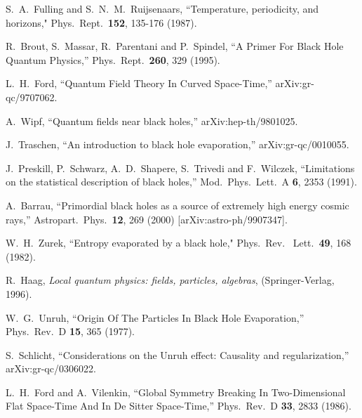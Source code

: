 \documentclass[12pt]{article}
\begin{document}
\begin{thebibliography}{99}
 S.~A.~Fulling and S.~N.~M.~Ruijsenaars,  ``Temperature, periodicity, and horizons,"  Phys.\ Rept.\  {\bf 152}, 135-176 (1987).

R.~Brout, S.~Massar, R.~Parentani and P.~Spindel,
``A Primer For Black Hole Quantum Physics,''
Phys.\ Rept.\  {\bf 260}, 329 (1995).

L.~H.~Ford,
``Quantum Field Theory In Curved Space-Time,''
arXiv:gr-qc/9707062.

A.~Wipf,
``Quantum fields near black holes,''
arXiv:hep-th/9801025.

J.~Traschen,
``An introduction to black hole evaporation,''
arXiv:gr-qc/0010055.

J.~Preskill, P.~Schwarz, A.~D.~Shapere, S.~Trivedi and F.~Wilczek,
``Limitations on the statistical description of black holes,''
Mod.\ Phys.\ Lett.\ A {\bf 6}, 2353 (1991).

A.~Barrau,
``Primordial black holes as a source of extremely high energy cosmic  rays,''
Astropart.\ Phys.\  {\bf 12}, 269 (2000)
[arXiv:astro-ph/9907347].

W.~H.~Zurek, ``Entropy evaporated by a black hole,"
Phys.\ Rev. \ Lett.\ {\bf 49}, 168 (1982).

R.~Haag, {\it Local quantum physics: fields, particles, algebras},
(Springer-Verlag, 1996).

W.~G.~Unruh,
``Origin Of The Particles In Black Hole Evaporation,''
Phys.\ Rev.\ D {\bf 15}, 365 (1977).


S.~Schlicht,
``Considerations on the Unruh effect: Causality and regularization,''
arXiv:gr-qc/0306022.

L.~H.~Ford and A.~Vilenkin,
``Global Symmetry Breaking In Two-Dimensional Flat Space-Time And In De Sitter Space-Time,''
Phys.\ Rev.\ D {\bf 33}, 2833 (1986).


\end{thebibliography}
\end{document}
